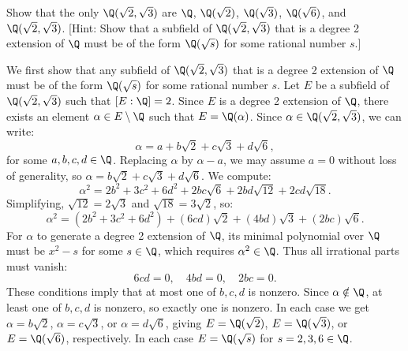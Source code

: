 \begin{problem}[43.30]
  Show that the only $\Q(\sqrt{2}, \sqrt{3})$ are $\Q$, $\Q(\sqrt{2})$, $\Q(\sqrt{3})$, $\Q(\sqrt{6})$, and $\Q(\sqrt{2}, \sqrt{3})$. [Hint: Show that a subfield of $\Q(\sqrt{2}, \sqrt{3})$ that is a degree 2 extension of $\Q$ must be of the form $\Q(\sqrt{s})$ for some rational number $s$.]
\end{problem}

\begin{solution}
  We first show that any subfield of $\Q(\sqrt{2}, \sqrt{3})$ that is a degree 2 extension of $\Q$ must be of the form $\Q(\sqrt{s})$ for some rational number $s$. Let $E$ be a subfield of $\Q(\sqrt{2}, \sqrt{3})$ such that $[E : \Q] = 2$. Since $E$ is a degree 2 extension of $\Q$, there exists an element $\alpha \in E \setminus \Q$ such that $E = \Q(\alpha)$. Since $\alpha \in \Q(\sqrt{2}, \sqrt{3})$, we can write:
  \[%
    \alpha = a + b\sqrt{2} + c\sqrt{3} + d\sqrt{6}
  ,\]%
  for some $a, b, c, d \in \Q$. Replacing $\alpha$ by $\alpha - a$, we may assume $a = 0$ without loss of generality, so $\alpha = b\sqrt{2} + c\sqrt{3} + d\sqrt{6}$. We compute:
  \[%
    \alpha^2 = 2b^2 + 3c^2 + 6d^2 + 2bc\sqrt{6} + 2bd\sqrt{12} + 2cd\sqrt{18}
  .\]%
  Simplifying, $\sqrt{12} = 2\sqrt{3}$ and $\sqrt{18} = 3\sqrt{2}$, so:
  \[%
    \alpha^2 = (2b^2 + 3c^2 + 6d^2) + (6cd)\sqrt{2} + (4bd)\sqrt{3} + (2bc)\sqrt{6}
  .\]%
  For $\alpha$ to generate a degree 2 extension of $\Q$, its minimal polynomial over $\Q$ must be $x^2 - s$ for some $s \in \Q$, which requires $\alpha^2 \in \Q$. Thus all irrational parts must vanish:
  \[%
    6cd = 0, \quad 4bd = 0, \quad 2bc = 0
  .\]%
  These conditions imply that at most one of $b, c, d$ is nonzero. Since $\alpha \notin \Q$, at least one of $b, c, d$ is nonzero, so exactly one is nonzero. In each case we get $\alpha = b\sqrt{2}$, $\alpha = c\sqrt{3}$, or $\alpha = d\sqrt{6}$, giving $E = \Q(\sqrt{2})$, $E = \Q(\sqrt{3})$, or $E = \Q(\sqrt{6})$, respectively. In each case $E = \Q(\sqrt{s})$ for $s = 2, 3, 6 \in \Q$.


\end{solution}
